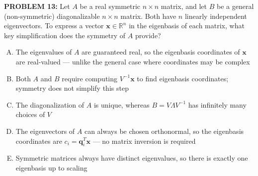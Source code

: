 \documentclass[12pt]{amsart}
\begin{document}
{\bf PROBLEM 13:}
%
Let $A$ be a real symmetric $n \times n$ matrix, and let $B$ be a 
general (non-symmetric) diagonalizable $n \times n$ matrix. Both 
have $n$ linearly independent eigenvectors.
To express a vector $\mathbf{x} \in \mathbb{R}^n$ in the eigenbasis 
of each matrix, what key simplification does the symmetry of $A$ provide?
\begin{enumerate}[(A)]
\item The eigenvalues of $A$ are guaranteed real, so the eigenbasis 
      coordinates of $\mathbf{x}$ are real-valued --- unlike the 
      general case where coordinates may be complex
\item Both $A$ and $B$ require computing $V^{-1}\mathbf{x}$ to find 
      eigenbasis coordinates; symmetry does not simplify this step
\item The diagonalization of $A$ is unique, whereas 
      $B = V\Lambda V^{-1}$ has infinitely many choices of $V$
\item The eigenvectors of $A$ can always be chosen orthonormal, so 
      the eigenbasis coordinates are $c_i = \mathbf{q}_i^T\mathbf{x}$ 
      --- no matrix inversion is required
\item Symmetric matrices always have distinct eigenvalues, so there 
      is exactly one eigenbasis up to scaling
\end{enumerate}
%
%
%
\end{document}
